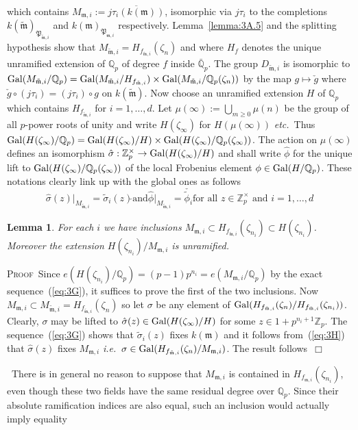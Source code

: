 \documentclass[12pt]{article}
\newtheorem{lemma}{Lemma}[section]
\newcounter{rem}[section]%
\newcommand{\barbbQ}{\ensuremath{\bar{\bbQ}}}
\newcommand{\bbQ}{\ensuremath{\mathbb{Q}}}
\newcommand{\bbZ}{\ensuremath{\mathbb{Z}}}
\newcommand{\beql}[1]{\begin{equation}\label{#1}}
\newcommand{\bPf}{\noindent \textsc{Proof\ }}
\newcommand{\eeq}{\end{equation}}
\newcommand{\ePf}{\hspace*{\fill}~$\Box$\vertsp\par}%
\newcommand{\etc}{\emph{etc.}}
\newcommand{\fm}{\ensuremath{\mathfrak{m}}}
\newcommand{\fP}{\ensuremath{\mathfrak{P}}}
\newcommand{\Gal}{{\rm Gal}}
\newcommand{\ie}{\emph{i.e.}}
\newcommand{\refeq}[1]{~(\ref{eq:#1})}
\newcommand{\rem}{\refstepcounter{rem}\noindent{\sc Remark \therem}}%
\renewcommand{\therem}{\thesection.\arabic{rem}}
\newcommand{\vertsp}{\vspace{1ex}}
\newcommand{\tfm}{\ensuremath{{\tilde{\fm}}}}
\newcommand{\tphi}{\ensuremath{\tilde{\phi}}}
\newcommand{\tsigma}{\ensuremath{\tilde{\sigma}}}
\begin{document}
which contains $M_{\fm,i}:=\overline{j\tau_i(k(\fm))}$,
isomorphic via $j\tau_i$ to the completions $k(\tfm)_{\fP_{\tfm,i}}$ and
$k(\fm)_{\fP_{\fm,i}}$ respectively.
Lemma~\ref{lemma:3A.5} and the splitting hypothesis show that
$M_{\tfm,i}=H_{f_{\tfm,i}}(\zeta_n)$
and where $H_{f}$ denotes the unique unramified extension
of $\bbQ_p$ of degree $f$ inside $\barbbQ_p$.
The group $D_{\tfm,i}$ is isomorphic to $\Gal(M_{\tfm,i}/\bbQ_p)=
\Gal(M_{\tfm,i}/H_{f_{\tfm,i}})\times \Gal(M_{\tfm,i}/\bbQ_p(\zeta_n))$
by the map $g\mapsto \check{g}$ where $\check{g}\circ(j\tau_i)=(j\tau_i)\circ g$
on $k(\tfm)$.
Now choose an unramified extension $H$ of $\bbQ_p$ which contains $H_{f_{\tfm,i}}$
for $i=1,\ldots,d$. Let $\mu(\infty):=\bigcup_{m\geq 0}\mu(n)$ be
the group of all $p$-power roots of unity and write
$H(\zeta_\infty)$ for $H(\mu(\infty))$ \etc\ Thus
$\Gal(H(\zeta_\infty)/\bbQ_p)=
\Gal(H(\zeta_\infty)/H)\times \Gal(H(\zeta_\infty)/\bbQ_p(\zeta_\infty))$.
The action on $\mu(\infty)$ defines an isomorphism
$\hat{\sigma}:\bbZ_p^\times\rightarrow\Gal(H(\zeta_\infty)/H)$ and
shall write $\hat{\phi}$ for the unique lift to $\Gal(H(\zeta_\infty)/\bbQ_p(\zeta_\infty))$
of the local Frobenius element $\phi\in\Gal(H/\bbQ_p)$.
These notations clearly link up with the global ones as follows
\beql{eq:3H}
\mbox{
$\hat{\sigma}(z)|_{M_{\tfm,i}}=\tsigma_i(z)\check{}$
and
$\hat{\phi}|_{M_{\tfm,i}}=\check{\tphi_i}$
for all $z\in\bbZ_p^\times$ and $i=1,\ldots,d$}
\eeq
\begin{lemma}\label{lemma:3D} For each $i$ we have inclusions
$M_{\fm,i}\subset H_{f_{\tfm,i}}(\zeta_{n_i})\subset H(\zeta_{n_i})$. Moreover
the extension $H(\zeta_{n_i})/M_{\fm,i}$ is unramified.
\end{lemma}
\bPf Since $e(H(\zeta_{n_i})/\bbQ_p)=(p-1)p^{n_i}=e(M_{\fm,i}/\bbQ_p)$ by
the exact sequence\refeq{3G}, it suffices to prove the first of the two inclusions.
Now $M_{\fm,i}\subset M_{\tfm,i}=H_{f_{\tfm,i}}(\zeta_n)$ so let
$\sigma$ be any element of $\Gal(H_{f_{\tfm,i}}(\zeta_n)/H_{f_{\tfm,i}}(\zeta_{n_i}))$.
Clearly, $\sigma$ may be lifted to $\hat{\sigma}(z)\in\Gal(H(\zeta_\infty)/H)$ for
some $z\in 1+p^{n_i+1}\bbZ_p$. The sequence\refeq{3G} shows that
$\tsigma_i(z)$ fixes $k(\fm)$ and it follows from\refeq{3H} that
$\hat{\sigma}(z)$ fixes $M_{\fm,i}$ \ie\
$\sigma\in \Gal(H_{f_{\tfm,i}}(\zeta_n)/M_{\fm,i})$. The result follows\ePf
\rem\ There is in general
no reason to suppose that $M_{\fm,i}$ is contained in
$H_{f_{\fm,i}}(\zeta_{n_i})$, even though
these two fields have the same residual degree over $\bbQ_p$. Since their absolute
ramification indices are also equal, such an inclusion would actually imply equality
\end{document}
